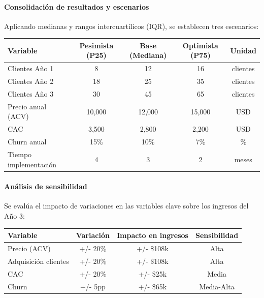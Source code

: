 \paragraph{Consolidación de resultados y escenarios}

Aplicando medianas y rangos intercuartílicos (IQR), se establecen tres escenarios:

\begin{center}
\begin{tabular}{|l|c|c|c|c|}
\hline
\textbf{Variable} & \textbf{Pesimista (P25)} & \textbf{Base (Mediana)} & \textbf{Optimista (P75)} & \textbf{Unidad} \\
\hline
Clientes Año 1 & 8 & 12 & 16 & clientes \\
\hline
Clientes Año 2 & 18 & 25 & 35 & clientes \\
\hline
Clientes Año 3 & 30 & 45 & 65 & clientes \\
\hline
Precio anual (ACV) & 10,000 & 12,000 & 15,000 & USD \\
\hline
CAC & 3,500 & 2,800 & 2,200 & USD \\
\hline
Churn anual & 15\% & 10\% & 7\% & \% \\
\hline
Tiempo implementación & 4 & 3 & 2 & meses \\
\hline
\end{tabular}
\end{center}

\paragraph{Análisis de sensibilidad}

Se evalúa el impacto de variaciones en las variables clave sobre los ingresos del Año 3:

\begin{center}
\begin{tabular}{|l|c|c|c|}
\hline
\textbf{Variable} & \textbf{Variación} & \textbf{Impacto en ingresos} & \textbf{Sensibilidad} \\
\hline
Precio (ACV) & +/- 20\% & +/- \$108k & Alta \\
\hline
Adquisición clientes & +/- 20\% & +/- \$108k & Alta \\
\hline
CAC & +/- 20\% & +/- \$25k & Media \\
\hline
Churn & +/- 5pp & +/- \$65k & Media-Alta \\
\hline
\end{tabular}
\end{center}

